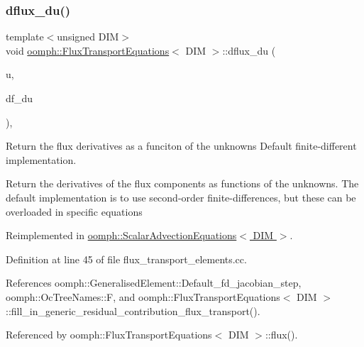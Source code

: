 \mbox{\label{classoomph_1_1FluxTransportEquations_a85c3239c26cb1fb4ddd102759eb0fc0d}} 
\subsubsection{\texorpdfstring{dflux\+\_\+du()}{dflux\_du()}}
{\footnotesize\ttfamily template$<$unsigned D\+IM$>$ \\
void \hyperlink{classoomph_1_1FluxTransportEquations}{oomph\+::\+Flux\+Transport\+Equations}$<$ D\+IM $>$\+::dflux\+\_\+du (\begin{DoxyParamCaption}\item[{const \hyperlink{classoomph_1_1Vector}{Vector}$<$ double $>$ \&}]{u,  }\item[{\hyperlink{classoomph_1_1RankThreeTensor}{Rank\+Three\+Tensor}$<$ double $>$ \&}]{df\+\_\+du }\end{DoxyParamCaption})\hspace{0.3cm}{\ttfamily [protected]}, {\ttfamily [virtual]}}



Return the flux derivatives as a funciton of the unknowns Default finite-\/different implementation. 

Return the derivatives of the flux components as functions of the unknowns. The default implementation is to use second-\/order finite-\/differences, but these can be overloaded in specific equations 

Reimplemented in \hyperlink{classoomph_1_1ScalarAdvectionEquations_af0073678c951417d6497ea0c772b30dc}{oomph\+::\+Scalar\+Advection\+Equations$<$ D\+I\+M $>$}.



Definition at line 45 of file flux\+\_\+transport\+\_\+elements.\+cc.



References oomph\+::\+Generalised\+Element\+::\+Default\+\_\+fd\+\_\+jacobian\+\_\+step, oomph\+::\+Oc\+Tree\+Names\+::F, and oomph\+::\+Flux\+Transport\+Equations$<$ D\+I\+M $>$\+::fill\+\_\+in\+\_\+generic\+\_\+residual\+\_\+contribution\+\_\+flux\+\_\+transport().



Referenced by oomph\+::\+Flux\+Transport\+Equations$<$ D\+I\+M $>$\+::flux().

